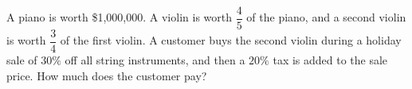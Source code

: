 A piano is worth \$1{,}000{,}000. A violin is worth $\dfrac45$ of the piano, and a second violin is worth $\dfrac34$ of the first violin. A customer buys the second violin during a holiday sale of $30\%$ off all string instruments, and then a $20\%$ tax is added to the sale price. How much does the customer pay?
